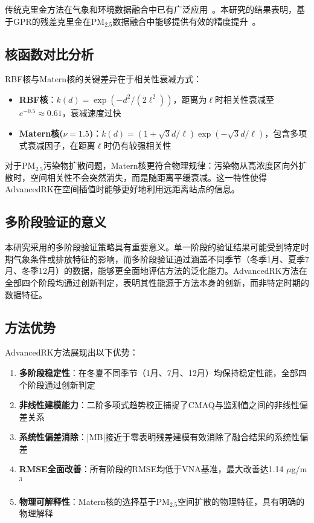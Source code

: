 \documentclass[UTF8, a4paper, 12pt]{article}
\begin{document}
传统克里金方法在气象和环境数据融合中已有广泛应用~\cite{cressman1959operational,cooley2007kriging}。本研究的结果表明，基于GPR的残差克里金在PM$_{2.5}$数据融合中能够提供有效的精度提升~\cite{zheng2020kriging}。

\subsection{核函数对比分析}

RBF核与Matern核的关键差异在于相关性衰减方式：

\begin{itemize}
    \item \textbf{RBF核}：$k(d) = \exp(-d^2/(2\ell^2))$，距离为$\ell$时相关性衰减至$e^{-0.5}\approx 0.61$，衰减速度过快
    \item \textbf{Matern核($\nu=1.5$)}：$k(d) = (1+\sqrt{3}d/\ell)\exp(-\sqrt{3}d/\ell)$，包含多项式衰减因子，在距离$\ell$时仍有较强相关性
\end{itemize}

对于PM$_{2.5}$污染物扩散问题，Matern核更符合物理规律：污染物从高浓度区向外扩散时，空间相关性不会突然消失，而是随距离平缓衰减。这一特性使得AdvancedRK在空间插值时能够更好地利用远距离站点的信息。

\subsection{多阶段验证的意义}

本研究采用的多阶段验证策略具有重要意义。单一阶段的验证结果可能受到特定时期气象条件或排放特征的影响，而多阶段验证通过涵盖不同季节（冬季1月、夏季7月、冬季12月）的数据，能够更全面地评估方法的泛化能力。AdvancedRK方法在全部四个阶段均通过创新判定，表明其性能源于方法本身的创新，而非特定时期的数据特征。

\subsection{方法优势}

AdvancedRK方法展现出以下优势：

\begin{enumerate}
    \item \textbf{多阶段稳定性}：在冬夏不同季节（1月、7月、12月）均保持稳定性能，全部四个阶段通过创新判定

    \item \textbf{非线性建模能力}：二阶多项式趋势校正捕捉了CMAQ与监测值之间的非线性偏差关系

    \item \textbf{系统性偏差消除}：|MB|接近于零表明残差建模有效消除了融合结果的系统性偏差

    \item \textbf{RMSE全面改善}：所有阶段的RMSE均低于VNA基准，最大改善达1.14 $\mu$g/m$^3$

    \item \textbf{物理可解释性}：Matern核的选择基于PM$_{2.5}$空间扩散的物理特征，具有明确的物理解释
\end{enumerate}
\end{document}
